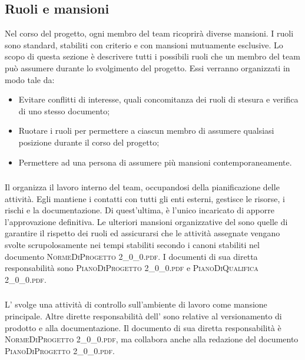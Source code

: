 	\subsection{Ruoli e mansioni}
	Nel corso del progetto, ogni membro del team ricoprirà diverse mansioni. I ruoli sono standard, stabiliti con criterio e con mansioni mutuamente esclusive. Lo scopo di questa sezione è descrivere tutti i possibili ruoli che un membro del team può assumere durante lo svolgimento del progetto. Essi verranno organizzati in modo tale da:
	\begin{itemize}
		\item Evitare conflitti di interesse, quali concomitanza dei ruoli di stesura e verifica di uno stesso documento;
		\item Ruotare i ruoli per permettere a ciascun membro di assumere qualsiasi posizione durante il corso del progetto;
		\item Permettere ad una persona di assumere più mansioni contemporaneamente.
	\end{itemize}

		\subsubsection{\RdP}
		Il \textit{\RdP} organizza il lavoro interno del team, occupandosi della pianificazione delle attività. Egli mantiene i contatti con tutti gli enti esterni, gestisce le risorse, i rischi e la documentazione. Di quest'ultima, è l'unico incaricato di apporre l'approvazione definitiva. Le ulteriori mansioni organizzative del \textit{\RdP} sono quelle di garantire il rispetto dei ruoli ed assicurarsi che le attività assegnate vengano svolte scrupolosamente nei tempi stabiliti secondo i canoni stabiliti nel documento \textsc{NormeDiProgetto 2\_0\_0.pdf}. I documenti di sua diretta responsabilità sono \textsc{PianoDiProgetto 2\_0\_0.pdf} e \textsc{PianoDiQualifica 2\_0\_0.pdf}.

		\subsubsection{\Amm}
		L'\textit{\Amm} svolge una attività di controllo sull'ambiente di lavoro come mansione principale. Altre dirette responsabilità dell'\textit{\Amm} sono relative al versionamento di prodotto e alla documentazione. Il documento di sua diretta responsabilità è \textsc{NormeDiProgetto 2\_0\_0.pdf}, ma collabora anche alla redazione del documento \textsc{PianoDiProgetto 2\_0\_0.pdf}.
		

